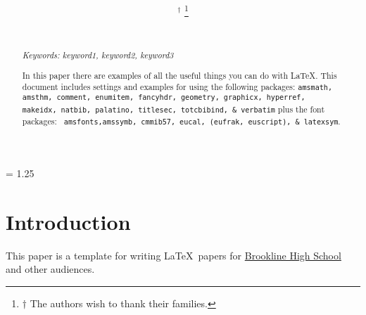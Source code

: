 \documentclass[11pt]{article}%
\title{{\bf \doctitle}}%
\author{\docauthortwo \\ \docschooltwo \\ \small{\lemail{\docemailtwo}}
 \and \docauthor$^\dagger$%
  \thanks{$\dagger$ The authors wish to thank their families.} \\ \docschool \\ \small{\lemail{\docemail}}}%
\date{} %
\begin{document}
\maketitle

\begin{multicols*}{2}
\begin{abstract}


{\em Keywords: keyword1, keyword2, keyword3 %

In this paper there are examples of all the useful things you can do
with \LaTeX. This document includes settings and examples for using
the following packages: {\tt amsmath, amsthm, comment, enumitem,
fancyhdr, geometry, graphicx, hyperref, makeidx, natbib, palatino,
titlesec, totcbibind, \& verbatim} plus the font packages: {\tt
amsfonts,amssymb, cmmib57, eucal, (eufrak, euscript), \& latexsym}.

}

\end{abstract}


\baselineskip = 1.25\baselineskip %

\section{Introduction}
\label{Introduction}

This paper is a template for writing \LaTeX\ papers for
\href{http://j.mp/psb_david_petty}{Brookline High School} and other
audiences.

\begin{comment} %

In this paper there are examples of all the useful things you can do
with \LaTeX. This document includes settings and examples for using
the following packages: {\tt amsmath, amsthm, comment, enumitem,
fancyhdr, geometry, graphicx, hyperref, makeidx, natbib, palatino,
titlesec, totcbibind, \& verbatim} plus the font packages: {\tt
amsfonts,amssymb, cmmib57, eucal, (eufrak, euscript), \& latexsym}

\lipsum[1]

\subsection{The quick brown fox}
\label{The quick brown fox}


\end{comment}
\end{multicols*}
\end{document}
